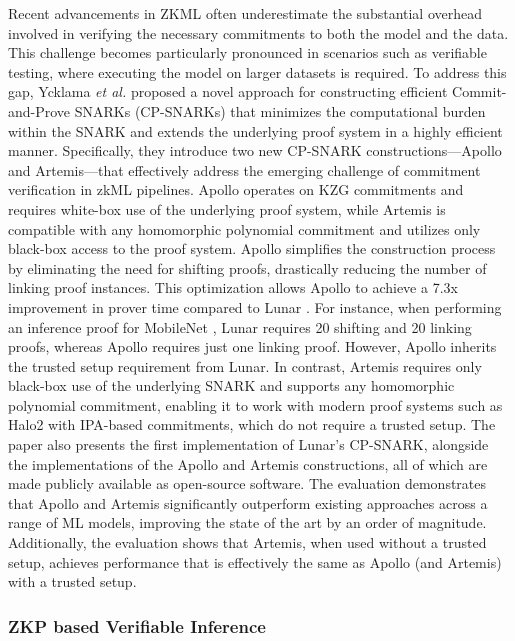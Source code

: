\documentclass[journal]{IEEEtran}
\begin{document}
Recent advancements in ZKML often underestimate the substantial overhead involved in verifying the necessary commitments to both the model and the data. This challenge becomes particularly pronounced in scenarios such as verifiable testing, where executing the model on larger datasets is required. To address this gap, Ycklama \emph{et al.} \cite{lycklama2024artemis} proposed a novel approach for constructing efficient Commit-and-Prove SNARKs (CP-SNARKs) that minimizes the computational burden within the SNARK and extends the underlying proof system in a highly efficient manner. Specifically, they introduce two new CP-SNARK constructions---Apollo and Artemis---that effectively address the emerging challenge of commitment verification in zkML pipelines. Apollo operates on KZG commitments and requires white-box use of the underlying proof system, while Artemis is compatible with any homomorphic polynomial commitment and utilizes only black-box access to the proof system. Apollo simplifies the construction process by eliminating the need for shifting proofs, drastically reducing the number of linking proof instances. This optimization allows Apollo to achieve a 7.3x improvement in prover time compared to Lunar \cite{ campanelli2021lunar}. For instance, when performing an inference proof for MobileNet \cite{ sandler2018mobilenetv2}, Lunar requires 20 shifting and 20 linking proofs, whereas Apollo requires just one linking proof. However, Apollo inherits the trusted setup requirement from Lunar. In contrast, Artemis requires only black-box use of the underlying SNARK and supports any homomorphic polynomial commitment, enabling it to work with modern proof systems such as Halo2 with IPA-based commitments, which do not require a trusted setup. The paper also presents the first implementation of Lunar's CP-SNARK, alongside the implementations of the Apollo and Artemis constructions, all of which are made publicly available as open-source software. The evaluation demonstrates that Apollo and Artemis significantly outperform existing approaches across a range of ML models, improving the state of the art by an order of magnitude. Additionally, the evaluation shows that Artemis, when used without a trusted setup, achieves performance that is effectively the same as Apollo (and Artemis) with a trusted setup.


\subsubsection{\bf ZKP based Verifiable Inference}\label{sss:3c}
\end{document}
